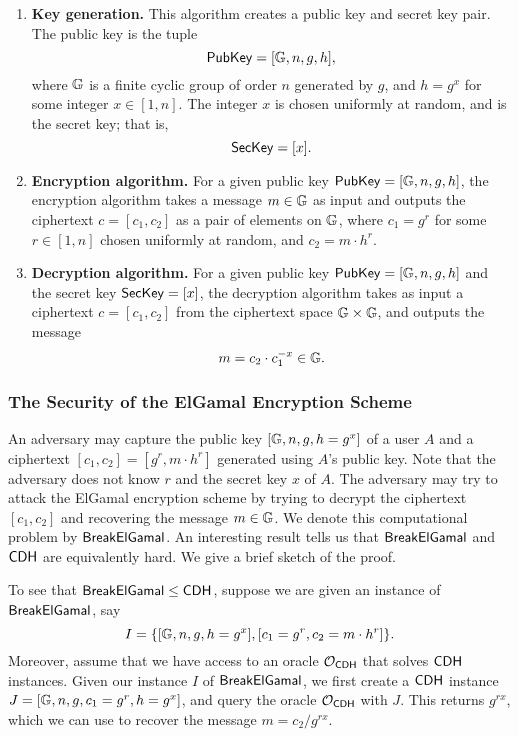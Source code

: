 \begin{enumerate}
    \item {\bf Key generation.} This algorithm creates a public key and secret key 
          pair. The public key is the tuple 
          \[ {\sf PubKey} = [\mathbb{G}, n, g, h], \] 
          where $\mathbb{G}$ is a finite cyclic group of order $n$ generated by $g$, and 
          $h = g^x$ for some integer $x \in [1, n]$. The integer $x$ is chosen 
          uniformly at random, and is the secret key; that is, 
          \[ {\sf SecKey} = [x]. \] 
    \item {\bf Encryption algorithm.} For a given public key ${\sf PubKey} = 
          [\mathbb{G}, n, g, h]$, the encryption algorithm takes a message $m \in \mathbb{G}$ as 
          input and outputs the ciphertext $c = [c_1, c_2]$ as a pair of elements 
          on $\mathbb{G}$, where $c_1 = g^r$ for some $r \in [1, n]$ chosen uniformly 
          at random, and $c_2 = m \cdot h^r$. 
    \item {\bf Decryption algorithm.} For a given public key ${\sf PubKey} = 
          [\mathbb{G}, n, g, h]$ and the secret key ${\sf SecKey} = [x]$, the decryption 
          algorithm takes as input a ciphertext $c = [c_1, c_2]$ from the 
          ciphertext space $\mathbb{G} \times \mathbb{G}$, and outputs the message 
          \[ m = c_2 \cdot c_1^{-x} \in \mathbb{G}. \] 
\end{enumerate}

\subsubsection{The Security of the ElGamal Encryption Scheme}
An adversary may capture the public key $[\mathbb{G}, n, g, h = g^x]$ of a user $A$ 
and a ciphertext $[c_1, c_2] = [g^r, m \cdot h^r]$ generated using $A$'s public 
key. Note that the adversary does not know $r$ and the secret key $x$ of $A$. 
The adversary may try to attack the ElGamal encryption scheme by trying to 
decrypt the ciphertext $[c_1, c_2]$ and recovering the message $m \in \mathbb{G}$. 
We denote this computational problem by ${\sf BreakElGamal}$. An interesting 
result tells us that ${\sf BreakElGamal}$ and ${\sf CDH}$ are equivalently hard. 
We give a brief sketch of the proof. 

To see that ${\sf BreakElGamal} \leq {\sf CDH}$, suppose we are given an instance 
of ${\sf BreakElGamal}$, say 
\[ I = \{[\mathbb{G}, n, g, h = g^x], [c_1 = g^r, c_2 = m \cdot h^r]\}. \] 
Moreover, assume that we have access to an oracle ${\cal O}_{{\sf CDH}}$ that solves 
${\sf CDH}$ instances. Given our instance $I$ of ${\sf BreakElGamal}$, we first create 
a ${\sf CDH}$ instance $J = [\mathbb{G}, n, g, c_1 = g^r, h = g^x]$, and query the 
oracle ${\cal O}_{{\sf CDH}}$ with $J$. This returns $g^{rx}$, which we can use 
to recover the message $m = c_2/g^{rx}$. 

